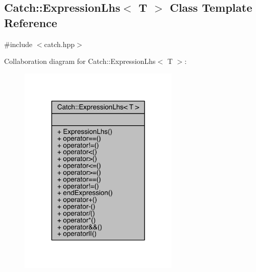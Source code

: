 \hypertarget{a00028}{}\subsection{Catch\+:\+:Expression\+Lhs$<$ T $>$ Class Template Reference}
\label{a00028}


{\ttfamily \#include $<$catch.\+hpp$>$}



Collaboration diagram for Catch\+:\+:Expression\+Lhs$<$ T $>$\+:\nopagebreak
\begin{figure}[H]
\begin{center}
\leavevmode
\includegraphics[width=216pt]{a00189}
\end{center}
\end{figure}
